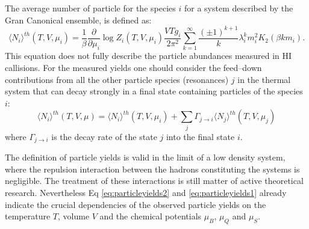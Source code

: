The average number of particle for the species $i$ for a system described by the Gran
Canonical ensemble, is defined as:
\begin{equation} \label{eq:particleyields1}
    \langle N_{i} \rangle ^{th} (T,V,\mu_{i}) = \frac{1}{\beta} \frac{\partial}{\partial \mu_{i}}
    \log Z_{i}(T,V,\mu_{i})
    \frac{V T g_{i}}{2 \pi^{2}}
    \sum_{k=1}^{\infty} \frac{(\pm 1)^{k+1}}{k} \lambda^{k}_{i} m_{i}^{2} K_{2}(\beta k m_{i}).
\end{equation}
This equation does not fully describe the particle abundances measured in HI callisions.
For the measured yields one should consider the feed–down contributions from all the other
particle species (resonances) $j$ in the thermal system that can decay strongly in a final
state containing particles of the species $i$:
\begin{equation} \label{eq:particleyields2}
    \langle N_{i} \rangle ^{th} (T,V,\mu) = \langle N_{i} \rangle ^{th} (T,V,\mu_{i})
    + \sum_{j} \Gamma_{j \to i} \langle N_{j} \rangle ^{th} (T,V,\mu_{j})
\end{equation}
where $\Gamma_{j \to i}$ is the decay rate of the state $j$ into the final state $i$.

The definition of particle yields is valid in the limit of a low density system, 
where the repulsion interaction between the hadrons constituting the systems is negligible.
The treatment of these interactions is still matter of active theoretical research. Nevertheless 
Eq \ref{eq:particleyields2} and \ref{eq:particleyields1} already indicate the crucial 
dependencies of the observed particle yields on the
temperature $T$, volume $V$ and the chemical potentials $\mu_B$, $\mu_Q$ and $\mu_S$.

